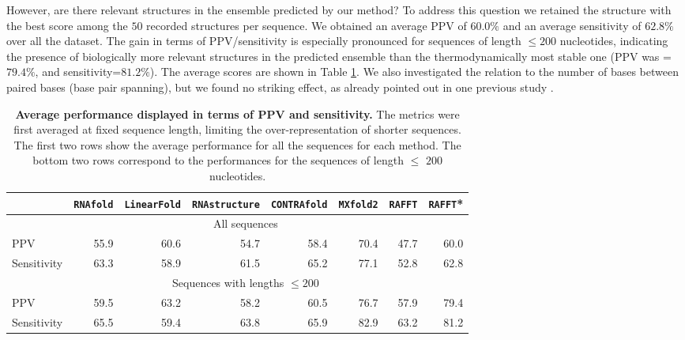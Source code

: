 However, are there relevant structures in the ensemble predicted by our method? To address this question we retained the structure with the best score among the $50$ recorded structures per sequence. We obtained an average PPV of $60.0\%$ and an average sensitivity of $62.8\%$ over all the dataset. The gain in terms of PPV/sensitivity is especially pronounced for sequences of length $\leq 200$ nucleotides, indicating the presence of biologically more relevant structures in the predicted ensemble than the thermodynamically most stable one (PPV was =$79.4\%$, and sensitivity=$81.2\%$). The average scores are shown in Table \ref{Tab:average_perf}. We also investigated the relation to the number of bases between paired bases (base pair spanning), but we found no striking effect, as already pointed out in one previous study \cite{amman13_troub_long_range_base_pairs_rna_foldin}.

\begin{table}[htbp]
	\caption{\label{Tab:average_perf}\textbf{Average performance displayed in terms of PPV and sensitivity.} The metrics were first averaged at fixed sequence length, limiting the over-representation of shorter sequences. The first two rows show the average performance for all the sequences for each method. The bottom two rows correspond to the performances for the sequences of length \(\leq\) $200$ nucleotides.}
\centering
\hspace*{-4cm}
\begin{tabular}{lrrrrrrr}
	\hline
	& \texttt{RNAfold} & \texttt{LinearFold} & \texttt{RNAstructure}  & \texttt{CONTRAfold} & \texttt{MXfold2} & \texttt{RAFFT} & \texttt{RAFFT}* \\
	\hline
	& \multicolumn{6}{c}{All sequences}\\
	\cmidrule{2-8}
	PPV         & 55.9 &	60.6 &	54.7 &	58.4 &	70.4 &	47.7 & 60.0 \\
	Sensitivity & 63.3 &	58.9 &	61.5 &	65.2 &	77.1 &	52.8 & 62.8 \\
	\hline
	& \multicolumn{6}{c}{Sequences with lengths \(\leq 200\)}\\
	\cmidrule{2-8}
	PPV         & 59.5 &	63.2 &	58.2 &	60.5 &	76.7 &	57.9 & 79.4  \\
	Sensitivity & 65.5 &	59.4 &	63.8 &	65.9 &	82.9 &	63.2 & 81.2 \\
	\hline
	
\end{tabular}

\end{table}


